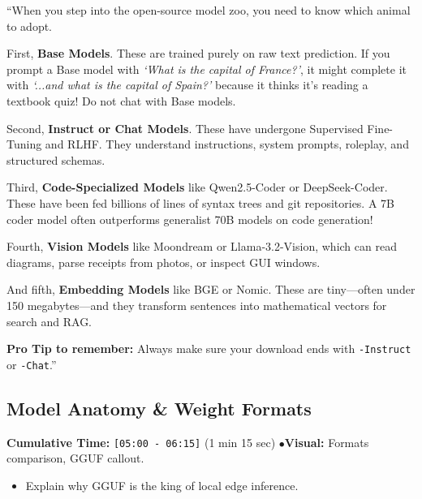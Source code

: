 \documentclass[11pt,a4paper]{article}
\begin{document}
\begin{speechbox}
``When you step into the open-source model zoo, you need to know which animal to adopt.

First, \textbf{Base Models}. These are trained purely on raw text prediction. If you prompt a Base model with \textit{`What is the capital of France?'}, it might complete it with \textit{`...and what is the capital of Spain?'} because it thinks it's reading a textbook quiz! Do not chat with Base models.

Second, \textbf{Instruct or Chat Models}. These have undergone Supervised Fine-Tuning and RLHF. They understand instructions, system prompts, roleplay, and structured schemas.

Third, \textbf{Code-Specialized Models} like Qwen2.5-Coder or DeepSeek-Coder. These have been fed billions of lines of syntax trees and git repositories. A 7B coder model often outperforms generalist 70B models on code generation!

Fourth, \textbf{Vision Models} like Moondream or Llama-3.2-Vision, which can read diagrams, parse receipts from photos, or inspect GUI windows.

And fifth, \textbf{Embedding Models} like BGE or Nomic. These are tiny---often under 150 megabytes---and they transform sentences into mathematical vectors for search and RAG.

\textbf{Pro Tip to remember:} Always make sure your download ends with \texttt{-Instruct} or \texttt{-Chat}.''
\end{speechbox}

\subsection{Model Anatomy \& Weight Formats}
\begin{directionbox}
    \textbf{Cumulative Time:} \texttt{[05:00 - 06:15]} (1 min 15 sec) \quad$\bullet$\quad \textbf{Visual:} Formats comparison, GGUF callout.
    \begin{itemize}
        \item Explain why GGUF is the king of local edge inference.
    \end{itemize}
\end{directionbox}
\end{document}
